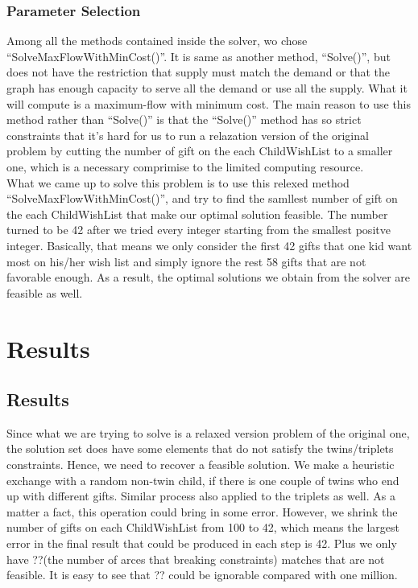 \documentclass[12pt]{article}
\begin{document}
\subsubsection{Parameter Selection}
Among all the methods contained inside the solver, wo chose ``SolveMaxFlowWithMinCost()''. It is same as another method, ``Solve()'', but does not have the restriction that supply must match the demand or that the graph has enough capacity to serve all the demand or use all the supply. What it will compute is a maximum-flow with minimum cost. The main reason to use this method rather than ``Solve()'' is that the ``Solve()'' method has so strict constraints that it's hard for us to run a relazation version of the original problem by cutting the number of gift on the each ChildWishList to a smaller one, which is a necessary comprimise to the limited computing resource. \\
What we came up to solve this problem is to use this relexed method ``SolveMaxFlowWithMinCost()'', and try to find the samllest number of gift on the each ChildWishList that make our optimal solution feasible. The number turned to be 42 after we tried every integer starting from the smallest positve integer. Basically, that means we only consider the first 42 gifts that one kid want most on his/her wish list and simply ignore the rest 58 gifts that are not favorable enough. As a result, the optimal solutions we obtain from the solver are feasible as well.



\section{Results}
\subsection{Results}
Since what we are trying to solve is a relaxed version problem of the original one, the solution set does have some elements that do not satisfy the twins/triplets constraints. Hence, we need to recover a feasible solution. We make a heuristic exchange with a random non-twin child, if there is one couple of twins who end up with different gifts. Similar process also applied to the triplets as well. As a matter a fact, this operation could bring in some error. However, we shrink the number of gifts on each ChildWishList from 100 to 42, which means the largest error in the final result that could be produced in each step is 42. Plus we only have {\color{red}??(the number of arces that breaking constraints)} matches that are not feasible. It is easy to see that {\color{red}??} could be ignorable compared with one million.
\end{document}
